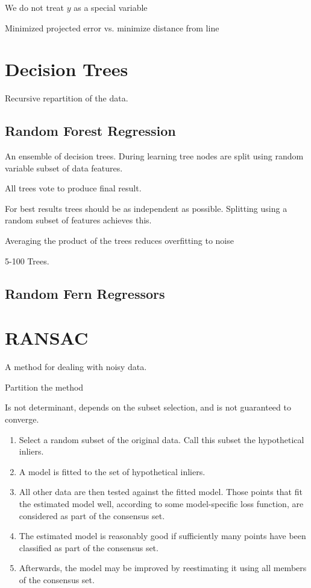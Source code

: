 We do not treat $y$ as a special variable

Minimized projected error vs. minimize distance from line


\section{Decision Trees}
Recursive repartition of the data. 

\subsection{Random Forest Regression}

An ensemble of decision trees. During learning tree nodes are split using random variable subset of data features.

All trees vote to produce final result.

For best results trees should be as independent as possible. Splitting using a random subset of features achieves this.

Averaging the product of the trees reduces overfitting to noise

5-100 Trees.

\subsection{Random Fern Regressors}

\section{RANSAC}

A method for dealing with noisy data. 

Partition the method 

Is not determinant, depends on the subset selection, and is not guaranteed to converge.

\begin{enumerate}
\item Select a random subset of the original data. Call this subset the hypothetical inliers.
\item A model is fitted to the set of hypothetical inliers.
\item All other data are then tested against the fitted model. Those points that fit the estimated model well, according to some model-specific loss function, are considered as part of the consensus set.
\item The estimated model is reasonably good if sufficiently many points have been classified as part of the consensus set.
\item Afterwards, the model may be improved by reestimating it using all members of the consensus set.
\end{enumerate}

